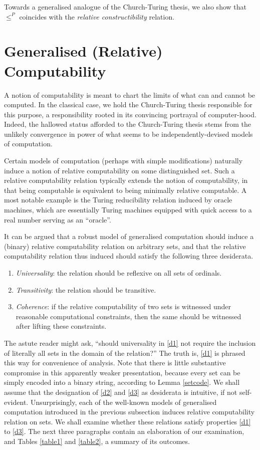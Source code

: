 \documentclass[12pt, twoside]{memoir}
\numberwithin{equation}{section}
\theoremstyle{definition}
\theoremstyle{remark}
\theoremstyle{definition}
\theoremstyle{definition}
\theoremstyle{definition}
\theoremstyle{remark}
\begin{document}
Towards a generalised analogue of the Church-Turing thesis, we also show that $\leq^P$ coincides with the \textit{relative constructibility} relation.

\section{Generalised (Relative) Computability}\label{subsec22}

A notion of computability is meant to chart the limits of what can and cannot be computed. In the classical case, we hold the Church-Turing thesis responsible for this purpose, a responsibility rooted in its convincing portrayal of computer-hood. Indeed, the hallowed status afforded to the Church-Turing thesis stems from the unlikely convergence in power of what seems to be independently-devised models of computation.

Certain models of computation (perhaps with simple modifications) naturally induce a notion of relative computability on some distinguished set. Such a relative computability relation typically extends the notion of computability, in that being computable is equivalent to being minimally relative computable. A most notable example is the Turing reducibility relation induced by oracle machines, which are essentially Turing machines equipped with quick access to a real number serving as an ``oracle''. 

It can be argued that a robust model of generalised computation should induce a (binary) relative computability relation on arbitrary sets, and that the relative computability relation thus induced should satisfy the following three desiderata.
\begin{enumerate}[leftmargin=40pt, label=(D\arabic*)]
    \item\label{d1} \textit{Universality}: the relation should be reflexive on all sets of ordinals.
    \item\label{d2} \textit{Transitivity}: the relation should be transitive.
    \item\label{d3} \textit{Coherence}: if the relative computability of two sets is witnessed under reasonable computational constraints, then the same should be witnessed after lifting these constraints.
\end{enumerate}
The astute reader might ask, ``should universality in \ref{d1} not require the inclusion of literally all sets in the domain of the relation?'' The truth is, \ref{d1} is phrased this way for convenience of analysis. Note that there is little substantive compromise in this apparently weaker presentation, because every set can be simply encoded into a binary string, according to Lemma \ref{setcode}. We shall assume that the designation of \ref{d2} and \ref{d3} as desiderata is intuitive, if not self-evident. Unsurprisingly, each of the well-known models of generalised computation introduced in the previous subsection induces relative computability relation on sets. We shall examine whether these relations satisfy properties \ref{d1} to \ref{d3}. The next three paragraphs contain an elaboration of our examination, and Tables \ref{table1} and \ref{table2}, a summary of its outcomes.
\end{document}

